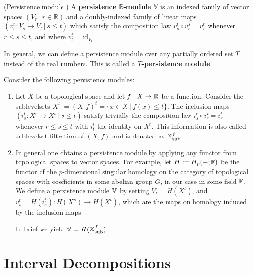 \begin{definition}{(Persistence module \cite[§1.1]{chazal2016structure})}
A \textbf{persistence $\mathbb{R}$-module $\mathbb{V}$} is an indexed family of vector spaces $(V_r \ \vert \ r \in \mathbb{R})$ and a doubly-indexed family of linear maps $(v_s^t: V_s \rightarrow V_t \ \vert \ s \leq t)$ which satisfy the composition law $v_s^t \circ v_r^s = v_r^t$ whenever $r \leq s \leq t$, and where $v_t^t = \text{id}_{V_t}$. 
\end{definition}

\begin{remark}
In general, we can define a persistence module over any partially ordered set $T$ instead of the real numbers. This is called a {\bfseries $T$-persistence module}.
\end{remark}

\begin{example}
Consider the following persistence modules:
\begin{enumerate}
	\item Let $X$ be a topological space and let $f: X \rightarrow {\mathbb R}$ be a function. Consider the sublevelsets $X^t := (X,f)^t = \{ x \in X \ \vert \ f(x) \leq t \}$. The inclusion maps $(i_s^t: X^s \rightarrow X^t \ \vert \ s \leq t)$ satisfy trivially the composition law $i_s^t \circ i_r^s = i_r^t$ whenever $r \leq s \leq t$ with $i_t^t$ the identity on $X^t$. This information is also called sublevelset filtration of $(X,f)$ and is denoted as ${\mathbb X}_{\text{sub}}^f$ \cite[p.7]{chazal2016structure}.
	\item In general one obtains a persistence module by applying any functor from topological spaces to vector spaces. For example, let $H := H_p(-;{\mathbb F})$ be the functor of the $p$-dimensional singular homology on the category of topological spaces with coefficients in some abelian group $G$, in our case in some field ${\mathbb F}$. We define a persistence module ${\mathbb V}$ by setting $V_t = H(X^t)$, and $v_s^t = H(i_s^t): H(X^s) \rightarrow H(X^t)$, which are the maps on homology induced by the inclusion maps \cite[p.7]{chazal2016structure}.

	In brief we yield ${\mathbb V} = H({\mathbb X}_{\text{sub}}^f)$.
\end{enumerate}
\end{example}

\section{Interval Decompositions}

